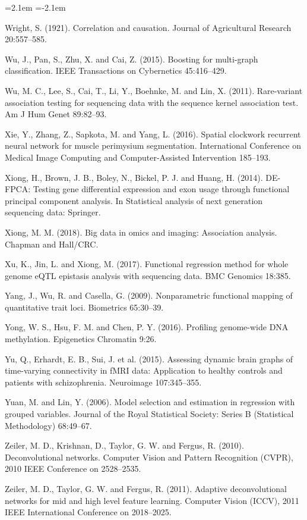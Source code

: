 \begin{list}{}{\leftmargin=2.1em  
  \itemindent=-2.1em \parsep=0pt \itemsep=2pt \topsep=0pt}
\item Wright, S. (1921). Correlation and causation. Journal of Agricultural Research 20:557--585.
\item Wu, J., Pan, S., Zhu, X. and Cai, Z. (2015). Boosting for multi-graph classification. IEEE Transactions on Cybernetics 45:416--429.
\item Wu, M. C., Lee, S., Cai, T., Li, Y., Boehnke, M. and Lin, X. (2011). Rare-variant association testing for sequencing data with the sequence kernel association test. Am J Hum Genet 89:82--93.
\item Xie, Y., Zhang, Z., Sapkota, M. and Yang, L. (2016). Spatial clockwork recurrent neural network for muscle perimysium segmentation. International Conference on Medical Image Computing and Computer-Assisted Intervention 185--193.
\item Xiong, H., Brown, J. B., Boley, N., Bickel, P. J. and Huang, H. (2014). DE-FPCA: Testing gene differential expression and exon usage through functional principal component analysis. In Statistical analysis of next generation sequencing data: Springer.
\item Xiong, M. M. (2018). Big data in omics and imaging: Association analysis. Chapman and Hall/CRC.
\item Xu, K., Jin, L. and Xiong, M. (2017). Functional regression method for whole genome eQTL epistasis analysis with sequencing data. BMC Genomics 18:385.
\item Yang, J., Wu, R. and Casella, G. (2009). Nonparametric functional mapping of quantitative trait loci. Biometrics 65:30--39.
\item Yong, W. S., Hsu, F. M. and Chen, P. Y. (2016). Profiling genome-wide DNA methylation. Epigenetics Chromatin 9:26.
\item Yu, Q., Erhardt, E. B., Sui, J. et al. (2015). Assessing dynamic brain graphs of time-varying connectivity in fMRI data: Application to healthy controls and patients with schizophrenia. Neuroimage 107:345--355.
\item Yuan, M. and Lin, Y. (2006). Model selection and estimation in regression with grouped variables. Journal of the Royal Statistical Society: Series B (Statistical Methodology) 68:49--67.
\item Zeiler, M. D., Krishnan, D., Taylor, G. W. and Fergus, R. (2010). Deconvolutional networks. Computer Vision and Pattern Recognition (CVPR), 2010 IEEE Conference on 2528--2535.
\item Zeiler, M. D., Taylor, G. W. and Fergus, R. (2011). Adaptive deconvolutional networks for mid and high level feature learning. Computer Vision (ICCV), 2011 IEEE International Conference on 2018--2025.

\end{list}
